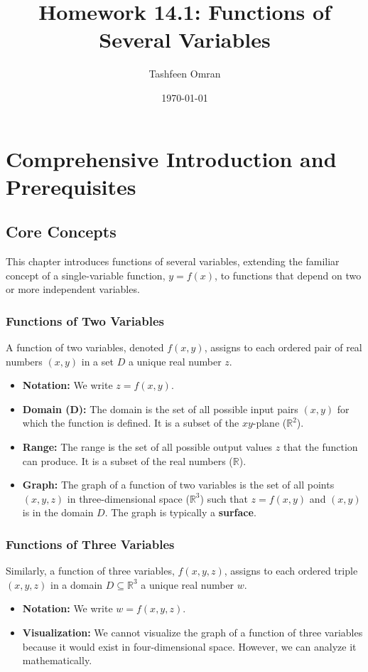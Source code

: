 \documentclass{article}
\title{Homework 14.1: Functions of Several Variables}
\author{Tashfeen Omran}
\date{\today}
\begin{document}
\maketitle

\section{Comprehensive Introduction and Prerequisites}

\subsection{Core Concepts}

This chapter introduces functions of several variables, extending the familiar concept of a single-variable function, $y = f(x)$, to functions that depend on two or more independent variables.

\subsubsection{Functions of Two Variables}
A function of two variables, denoted $f(x, y)$, assigns to each ordered pair of real numbers $(x, y)$ in a set $D$ a unique real number $z$.
\begin{itemize}
    \item \textbf{Notation:} We write $z = f(x, y)$.
    \item \textbf{Domain (D):} The domain is the set of all possible input pairs $(x, y)$ for which the function is defined. It is a subset of the $xy$-plane ($\mathbb{R}^2$).
    \item \textbf{Range:} The range is the set of all possible output values $z$ that the function can produce. It is a subset of the real numbers ($\mathbb{R}$).
    \item \textbf{Graph:} The graph of a function of two variables is the set of all points $(x, y, z)$ in three-dimensional space ($\mathbb{R}^3$) such that $z = f(x, y)$ and $(x, y)$ is in the domain $D$. The graph is typically a \textbf{surface}.
\end{itemize}

\subsubsection{Functions of Three Variables}
Similarly, a function of three variables, $f(x, y, z)$, assigns to each ordered triple $(x, y, z)$ in a domain $D \subseteq \mathbb{R}^3$ a unique real number $w$.
\begin{itemize}
    \item \textbf{Notation:} We write $w = f(x, y, z)$.
    \item \textbf{Visualization:} We cannot visualize the graph of a function of three variables because it would exist in four-dimensional space. However, we can analyze it mathematically.
\end{itemize}
\end{document}
